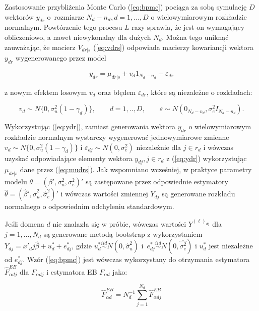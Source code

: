 Zastosowanie przybliżenia Monte Carlo (\ref{eq:bpmc}) pociąga za sobą symulację $D$ wektorów $y_{dr}$ o~rozmiarze $N_d-n_d, d=1,...,D$ o wielowymiarowym rozkładzie normalnym. Powtórzenie tego procesu $L$ razy sprawia, że jest on wymagający obliczeniowo, a nawet niewykonalny dla dużych $N_d$. Można tego uniknąć zauważając, że macierz $V_{dr|s}$ (\ref{eq:vdrs}) odpowiada macierzy kowariancji wektora $y_{dr}$ wygenerowanego przez model

\begin{equation}
y_{dr}=\mu_{dr|s}+v_d1_{N_d-n_d}+\varepsilon_{dr}
\label{eq:ydr}
\end{equation}

z nowym efektem losowym $v_d$ oraz błędem $\varepsilon_{dr}$, które są niezależne o rozkładach:

\begin{equation}
v_d \sim N\{0,\sigma^2_u(1-\gamma_d)\},\qquad d=1,..,D, \qquad \varepsilon \sim N(0_{N_d-n_d},\sigma^2_eI_{N_d-n_d}).
\end{equation}

Wykorzystując (\ref{eq:ydr}), zamiast generowania wektora $y_{dr}$ o wielowymiarowym rozkładzie normalnym wystarczy wygenerować jednowymiarowe zmienne $v_d \sim N\{0,\sigma^2_u(1-\gamma_d)\}$ i $\varepsilon_{dj} \sim N(0, \sigma^2_e)$ niezależnie dla $j \in r_d$ i wówczas uzyskać odpowiadające elementy wektora $y_{dj}, j \in r_d$ z (\ref{eq:ydr}) wykorzystując $\mu_{dr|s}$ dane przez (\ref{eq:mudrs}). Jak wspomniano wcześniej, w praktyce parametry modelu $\theta=(\beta',\sigma^2_u,\sigma^2_e)'$ są zastępowane przez odpowiednie estymatory $\hat{\theta}=(\hat{\beta}',\hat{\sigma}^2_u,\hat{\sigma}^2_e)'$ i wówczas wartości zmiennej $Y_{dj}$ są generowane rozkładu normalnego o odpowiednim odchyleniu standardowym.

Jeśli domena $d$ nie znalazła się w próbie, wówczas wartości $Y^{(\ell)_{dj}}$ dla $j=1,...,N_d$ są generowane metodą bootstrap z wykorzystaniem $Y_{dj}=x'_dj\hat{\beta}+u^*_d+e^*_{dj}$, gdzie $u^*_d\stackrel{iid}{\sim}N(0,\hat{\sigma}^2_u)$ i~$e^*_{dj}\stackrel{iid}{\sim}N(0,\hat{\sigma^2_e})$ i $u^*_d$ jest niezależne od $e^*_{dj}$. Wzór (\ref{eq:bpmc}) jest wówczas wykorzystany do otrzymania estymatora $\hat{F}^{EB}_{\alpha dj}$ dla $F_{\alpha d j}$ i estymatora EB $F_{\alpha d}$ jako:

\begin{equation}
\hat{F}_{\alpha d}^{EB}=N_d^{-1}\sum\limits_{j=1}^{N_d}{\hat{F}^{EB}_{\alpha dj}}
\label{eq:febad2}
\end{equation}

